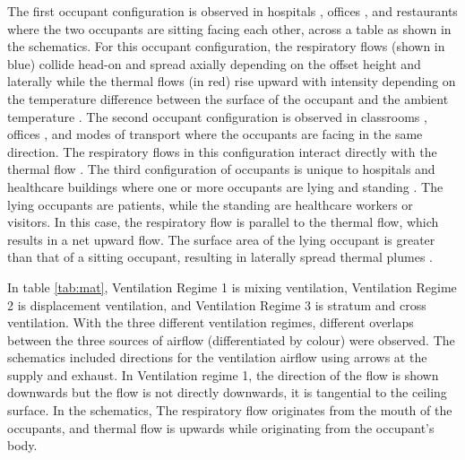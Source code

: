 \documentclass[a4paper,12pt]{elsarticle}
\begin{document}
The first occupant configuration is observed in hospitals \cite{zhou2021experimental}, offices \cite{li2023numerical}, and restaurants \cite{oksanen2022combining} where the two occupants are sitting facing each other, across a table as shown in the schematics. For this occupant configuration, the respiratory flows (shown in blue) collide head-on and spread axially depending on the offset height and laterally \cite{giri2022colliding, singhal2022virus} while the thermal flows (in red) rise upward with intensity depending on the temperature difference between the surface of the occupant and the ambient temperature \cite{zhang2019distribution}. The second occupant configuration is observed in classrooms \cite{qin2023transmission}, offices \cite{he2011cfd}, and modes of transport \cite{yan2021transmission,ho2021modeling} where the occupants are facing in the same direction. The respiratory flows in this configuration interact directly with the thermal flow \cite{ou2022insufficient}. The third configuration of occupants is unique to hospitals and healthcare buildings where one or more occupants are lying and standing \cite{villafruela2019assessment, lu2020reducing}. The lying occupants are patients, while the standing are healthcare workers or visitors. In this case, the respiratory flow is parallel to the thermal flow, which results in a net upward flow. The surface area of the lying occupant is greater than that of a sitting occupant, resulting in laterally spread thermal plumes \cite{feng2020influence}.

In table \ref{tab:mat}, Ventilation Regime 1 is mixing ventilation, Ventilation Regime 2 is displacement ventilation, and Ventilation Regime 3 is stratum and cross ventilation. With the three different ventilation regimes, different overlaps between the three sources of airflow (differentiated by colour) were observed. The schematics included directions for the ventilation airflow using arrows at the supply and exhaust. In Ventilation regime 1, the direction of the flow is shown downwards but the flow is not directly downwards, it is tangential to the ceiling surface. In the schematics, The respiratory flow originates from the mouth of the occupants, and thermal flow is upwards while originating from the occupant's body. 
\end{document}
